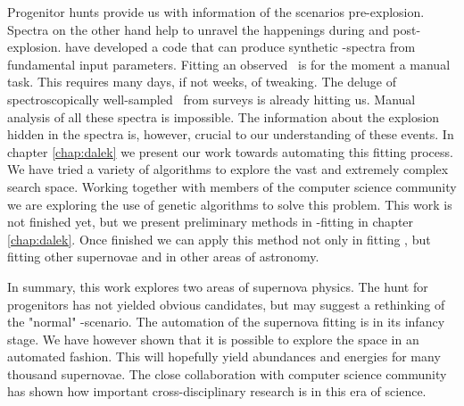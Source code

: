 Progenitor hunts provide us with information of the scenarios pre-explosion. Spectra on the other hand help to unravel the happenings during and post-explosion. \cite{2008MNRAS.386.1897M} have developed a code that can produce synthetic \snia-spectra from fundamental input parameters. Fitting an observed \snia\ is for the moment a manual task. This requires many days, if not weeks, of tweaking. The deluge of spectroscopically well-sampled \sneia\ from surveys is already hitting us. Manual analysis of all these spectra is impossible. The information about the explosion hidden in the spectra is, however, crucial to our understanding of these events. In chapter \ref{chap:dalek} we present our work towards automating this fitting process. We have tried a variety of algorithms to explore the vast and extremely complex search space. Working together with members of the computer science community we are exploring the use of genetic algorithms to solve this problem. 
This work is not finished yet, but we present preliminary methods in \snia-fitting in chapter \ref{chap:dalek}. Once finished we can apply this method not only in fitting \snia, but fitting other supernovae and in other areas of astronomy. 

In summary, this work explores two areas of supernova physics. The hunt for progenitors has not yielded obvious candidates, but may suggest a rethinking of the "normal" \sd-scenario. The automation of the supernova fitting is in its infancy stage. We have however shown that it is possible to explore the space in an automated fashion. This will hopefully yield abundances and energies for many thousand supernovae. 
The close collaboration with computer science community has shown how important cross-disciplinary research is in this era of science. 


